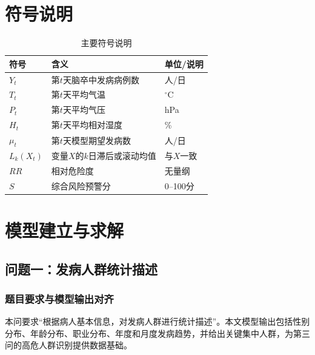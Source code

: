 \documentclass[UTF8,a4paper,12pt]{ctexart}
\begin{document}
\section{符号说明}
\begin{table}[H]\centering\caption{主要符号说明}
\begin{tabular}{lll}\toprule
符号 & 含义 & 单位/说明\\ \midrule
$Y_t$ & 第$t$天脑卒中发病病例数 & 人/日\\
$T_t$ & 第$t$天平均气温 & $^\circ$C\\
$P_t$ & 第$t$天平均气压 & hPa\\
$H_t$ & 第$t$天平均相对湿度 & \%\\
$\mu_t$ & 第$t$天模型期望发病数 & 人/日\\
$L_k(X_t)$ & 变量$X$的$k$日滞后或滚动均值 & 与$X$一致\\
$RR$ & 相对危险度 & 无量纲\\
$S$ & 综合风险预警分 & 0--100分\\
\bottomrule\end{tabular}\end{table}

\section{模型建立与求解}
\subsection{问题一：发病人群统计描述}
\subsubsection{题目要求与模型输出对齐}
本问要求“根据病人基本信息，对发病人群进行统计描述”。本文模型输出包括性别分布、年龄分布、职业分布、年度和月度发病趋势，并给出关键集中人群，为第三问的高危人群识别提供数据基础。
\end{document}
